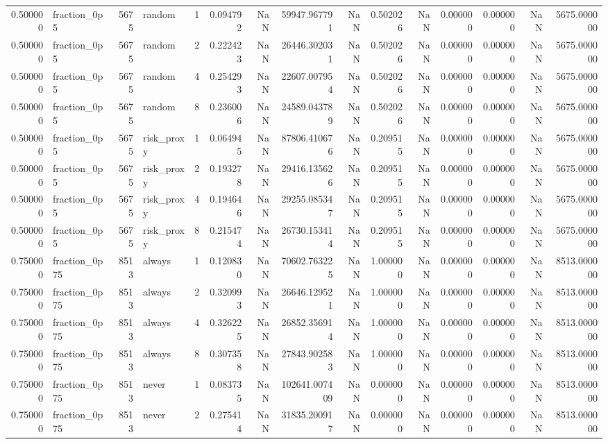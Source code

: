 \begin{tabular}{rlrlrrrrrrrrrrr}
0.500000 & fraction\_0p5 & 5675 & random & 1 & 0.094792 & NaN & 59947.967791 & NaN & 0.502026 & NaN & 0.000000 & 0.000000 & NaN & 5675.000000 \\
0.500000 & fraction\_0p5 & 5675 & random & 2 & 0.222423 & NaN & 26446.302031 & NaN & 0.502026 & NaN & 0.000000 & 0.000000 & NaN & 5675.000000 \\
0.500000 & fraction\_0p5 & 5675 & random & 4 & 0.254293 & NaN & 22607.007954 & NaN & 0.502026 & NaN & 0.000000 & 0.000000 & NaN & 5675.000000 \\
0.500000 & fraction\_0p5 & 5675 & random & 8 & 0.236006 & NaN & 24589.043789 & NaN & 0.502026 & NaN & 0.000000 & 0.000000 & NaN & 5675.000000 \\
0.500000 & fraction\_0p5 & 5675 & risk\_proxy & 1 & 0.064945 & NaN & 87806.410676 & NaN & 0.209515 & NaN & 0.000000 & 0.000000 & NaN & 5675.000000 \\
0.500000 & fraction\_0p5 & 5675 & risk\_proxy & 2 & 0.193278 & NaN & 29416.135626 & NaN & 0.209515 & NaN & 0.000000 & 0.000000 & NaN & 5675.000000 \\
0.500000 & fraction\_0p5 & 5675 & risk\_proxy & 4 & 0.194646 & NaN & 29255.085347 & NaN & 0.209515 & NaN & 0.000000 & 0.000000 & NaN & 5675.000000 \\
0.500000 & fraction\_0p5 & 5675 & risk\_proxy & 8 & 0.215474 & NaN & 26730.153414 & NaN & 0.209515 & NaN & 0.000000 & 0.000000 & NaN & 5675.000000 \\
0.750000 & fraction\_0p75 & 8513 & always & 1 & 0.120830 & NaN & 70602.763225 & NaN & 1.000000 & NaN & 0.000000 & 0.000000 & NaN & 8513.000000 \\
0.750000 & fraction\_0p75 & 8513 & always & 2 & 0.320993 & NaN & 26646.129521 & NaN & 1.000000 & NaN & 0.000000 & 0.000000 & NaN & 8513.000000 \\
0.750000 & fraction\_0p75 & 8513 & always & 4 & 0.326225 & NaN & 26852.356914 & NaN & 1.000000 & NaN & 0.000000 & 0.000000 & NaN & 8513.000000 \\
0.750000 & fraction\_0p75 & 8513 & always & 8 & 0.307358 & NaN & 27843.902583 & NaN & 1.000000 & NaN & 0.000000 & 0.000000 & NaN & 8513.000000 \\
0.750000 & fraction\_0p75 & 8513 & never & 1 & 0.083735 & NaN & 102641.007409 & NaN & 0.000000 & NaN & 0.000000 & 0.000000 & NaN & 8513.000000 \\
0.750000 & fraction\_0p75 & 8513 & never & 2 & 0.275414 & NaN & 31835.200917 & NaN & 0.000000 & NaN & 0.000000 & 0.000000 & NaN & 8513.000000 \\

\end{tabular}
